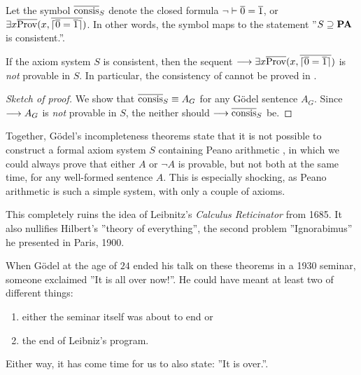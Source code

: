 \documentclass[11pt,a4paper]{article}
\begin{document}
\begin{definition}\label{def:symbol for consistency}
    Let the symbol \(\consis\) denote the closed formula
    \(\lnot\vdash\overline{0}=\overline{1}\), or \(\exists x\overline{\operatorname{Prov}}(x,\overline{\lceil\overline{0}=\overline{1}\rceil})\).
    In other words, the symbol maps to the statement ''\(S\supseteq\textbf{PA}\) is consistent.''.
\end{definition}

\begin{theorem}\label{the:Gödel's second incompleteness theorem}
    If the axiom system \(S\) is consistent, then the sequent
    \(\longrightarrow\exists x\overline{\operatorname{Prov}}(x,\overline{\lceil\overline{0}=\overline{1}\rceil})\) is \emph{not}
    provable in \(S\). In particular, the consistency of \PA{}
    cannot be proved in \PA.
\end{theorem}

\begin{proof}[Sketch of proof]
    We show that \(\consis\equiv A_G\) for any Gödel sentence \(A_G\).
    Since \(\longrightarrow A_G\) is \emph{not} provable in \(S\), the neither should
    \(\seq\consis\) be.
\end{proof}

Together, Gödel's incompleteness theorems state that
it is not possible to construct a formal axiom system
\(S\) containing Peano arithmetic \PA{},
in which we could always prove that either
\(A\) or \(\lnot A\) is provable, but not both at the same time,
for any well-formed sentence \(A\).
This is especially shocking, as Peano arithmetic is such
a simple system, with only a couple of axioms.

This completely ruins the idea of Leibnitz's
\emph{Calculus Reticinator} from 1685.
It also nullifies Hilbert's ''theory of everything'',
the second problem ''Ignorabimus'' he presented in Paris, 1900.

When Gödel at the age of \(24\) ended his talk
on these theorems in a 1930 seminar, someone exclaimed
''It is all over now!''. He could have meant at least
two of different things:
\begin{enumerate}
    \item either the seminar itself was about to end or
    \item the end of Leibniz's program.
\end{enumerate}
Either way, it has come time for us to also state:
''It is over.''.



{\raggedright%
\printbibliography[heading=bibintoc]%
}
\end{document}
